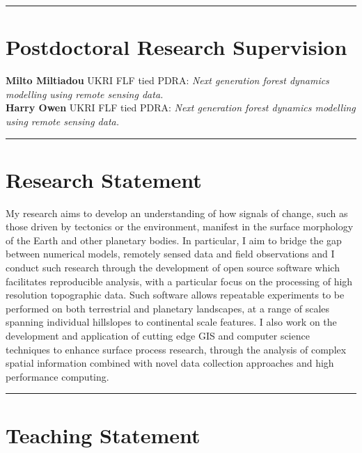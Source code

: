 \documentclass[10pt, a4paper]{article}
\newcommand{\years}[1]{\marginnote{\scriptsize #1}}
\begin{document}
\hrule
\section*{Postdoctoral Research Supervision}
\noindent

\years{2022--} \textbf{Milto Miltiadou} UKRI FLF tied PDRA: \textit{Next generation forest dynamics modelling using remote sensing data.}\\[0.05cm]
\years{2021--} \textbf{Harry Owen} UKRI FLF tied PDRA: \textit{Next generation forest dynamics modelling using remote sensing data.}\\[0.05cm]


\iflong

  \hrule
  \section*{Research Statement}
  \noindent

  My research aims to develop an understanding of how signals of change, such as those driven by tectonics or the environment, manifest in the surface morphology of the Earth and other planetary bodies. In particular, I aim to bridge the gap between numerical models, remotely sensed data and field observations and I conduct such research through the development of open source software which facilitates reproducible analysis, with a particular focus on the processing of high resolution topographic data. Such software allows repeatable experiments to be performed on both terrestrial and planetary landscapes, at a range of scales spanning individual hillslopes to continental scale features. I also work on the development and application of cutting edge GIS and computer science techniques to enhance surface process research, through the analysis of complex spatial information combined with novel data collection approaches and high performance computing.\\[0.05cm]

  \hrule
  \section*{Teaching Statement}
  \noindent
\end{document}
